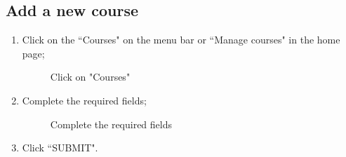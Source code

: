 \documentclass[ManualeUtente]{subfiles}
\begin{document}
\subsection{Add a new course}
\begin{enumerate}
	\item Click on the \textquotedblleft Courses" on the menu bar or \textquotedblleft Manage courses" in the home page;
	\begin{figure}[H]
		\centering
		\caption{Click on "Courses"}
		\label{fig:Click on "Courses"}
	\end{figure}
	\item Complete the required fields;
	\begin{figure}[H]
		\centering
		\caption{Complete the required fields}
		\label{fig:Complete the required fields}
	\end{figure}
	\item Click \textquotedblleft SUBMIT".

\end{enumerate}
\end{document}
